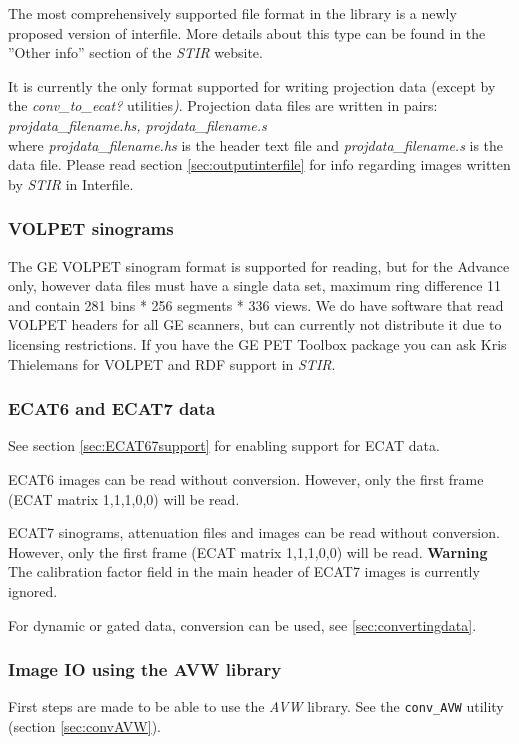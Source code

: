 \documentclass{article}
\begin{document}
The most comprehensively supported file format in the library 
is a newly proposed version of interfile. More details about 
this type can be found in the ''Other info'' section of the \textit{STIR} website.

It is currently the only format supported for writing projection 
data (except by the \textit{conv\_to\_ecat?} utilities\textit{)}. Projection 
data files are written in pairs:\\
\textit{projdata\_filename.hs, 
projdata\_filename.s}\\
where \textit{projdata\_filename.hs} is the header text file and \textit{projdata\_filename.s} 
is the data file. Please read section \ref{sec:outputinterfile} for info regarding 
images written by \textit{STIR} in Interfile.

\subsubsection{VOLPET sinograms}

The GE VOLPET sinogram format is supported for reading, but for
the Advance only, 
however data files must have a single data set, maximum ring 
difference 11 and contain 281 bins * 256 segments * 336 views. 
We do have software that read VOLPET headers for all GE scanners, but can currently
not distribute it due to licensing restrictions. If you have the
GE PET Toolbox package you can ask Kris Thielemans for VOLPET and RDF
support in \textit{STIR}.

\subsubsection{ECAT6 and ECAT7 data} 
See section \ref{sec:ECAT67support} for enabling support for ECAT data.

ECAT6 images can be read without conversion. However, only the 
first frame (ECAT matrix 1,1,1,0,0) will be read.

ECAT7 sinograms, attenuation files and images can be read without 
conversion. However, only the first frame (ECAT matrix 1,1,1,0,0) 
will be read.
\textbf{Warning} The calibration factor field in the main header of ECAT7 images
is currently ignored.

For dynamic or gated data, conversion can be used, see \ref{sec:convertingdata}.

\subsubsection{Image IO using the AVW library}
First steps are made to be able to use the \textit{AVW} library. See the
\texttt{conv\_AVW} utility (section \ref{sec:convAVW}).
\end{document}
